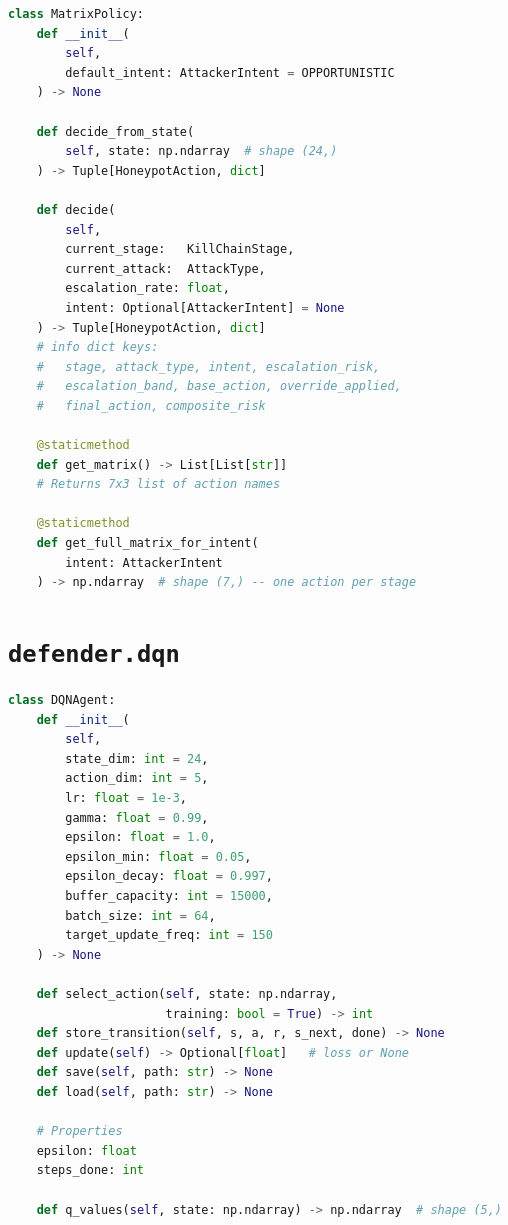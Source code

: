 \begin{lstlisting}[language=Python, caption={Stage-Escalation Decision Matrix interface.}]
class MatrixPolicy:
    def __init__(
        self,
        default_intent: AttackerIntent = OPPORTUNISTIC
    ) -> None

    def decide_from_state(
        self, state: np.ndarray  # shape (24,)
    ) -> Tuple[HoneypotAction, dict]

    def decide(
        self,
        current_stage:   KillChainStage,
        current_attack:  AttackType,
        escalation_rate: float,
        intent: Optional[AttackerIntent] = None
    ) -> Tuple[HoneypotAction, dict]
    # info dict keys:
    #   stage, attack_type, intent, escalation_risk,
    #   escalation_band, base_action, override_applied,
    #   final_action, composite_risk

    @staticmethod
    def get_matrix() -> List[List[str]]
    # Returns 7x3 list of action names

    @staticmethod
    def get_full_matrix_for_intent(
        intent: AttackerIntent
    ) -> np.ndarray  # shape (7,) -- one action per stage
\end{lstlisting}

\section{\texttt{defender.dqn}}

\begin{lstlisting}[language=Python, caption={DQN agent interface.}]
class DQNAgent:
    def __init__(
        self,
        state_dim: int = 24,
        action_dim: int = 5,
        lr: float = 1e-3,
        gamma: float = 0.99,
        epsilon: float = 1.0,
        epsilon_min: float = 0.05,
        epsilon_decay: float = 0.997,
        buffer_capacity: int = 15000,
        batch_size: int = 64,
        target_update_freq: int = 150
    ) -> None

    def select_action(self, state: np.ndarray,
                      training: bool = True) -> int
    def store_transition(self, s, a, r, s_next, done) -> None
    def update(self) -> Optional[float]   # loss or None
    def save(self, path: str) -> None
    def load(self, path: str) -> None

    # Properties
    epsilon: float
    steps_done: int

    def q_values(self, state: np.ndarray) -> np.ndarray  # shape (5,)
\end{lstlisting}

